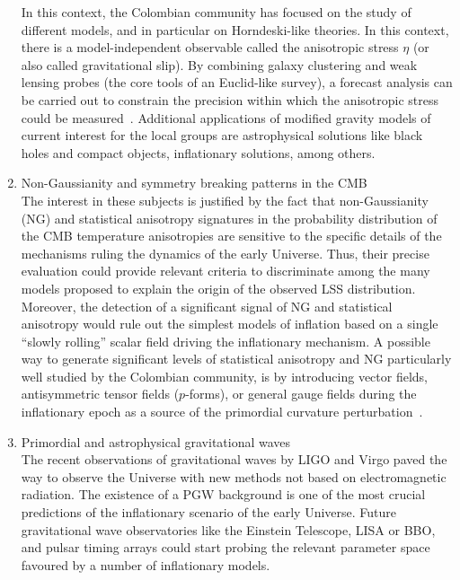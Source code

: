 \documentclass[a4paper,11pt]{article}
\begin{document}
\begin{enumerate}
In this context, the Colombian community has focused on the study of different models, and in particular on Horndeski-like theories. In this context, there is a model-independent observable called the anisotropic stress $\eta$ (or also called gravitational slip). By combining galaxy clustering and weak lensing probes (the core tools of an Euclid-like survey), a forecast analysis can be carried out to constrain the precision within which the anisotropic stress could be measured~\cite{Amendola:2013qna}. Additional applications of modified gravity models of current interest for the local groups are astrophysical solutions like black holes and compact objects, inflationary solutions, among others. 
%
\item
Non-Gaussianity and symmetry breaking patterns in the CMB\\
The interest in these subjects is justified by the fact that non-Gaussianity (NG) and statistical anisotropy signatures in the probability distribution of the CMB temperature anisotropies are sensitive to the specific details of the mechanisms ruling the dynamics of the early Universe. Thus, their precise evaluation could provide relevant criteria to discriminate among the many models proposed to explain the origin of the observed LSS distribution. Moreover, the detection of a significant signal of NG and statistical anisotropy would rule out the simplest models of inflation based on a single ``slowly rolling'' scalar field driving the inflationary mechanism. A possible way to generate significant levels of statistical anisotropy and NG particularly well studied by the Colombian community, is by introducing vector fields, antisymmetric tensor fields ($p$-forms), or general gauge fields during the inflationary epoch as a source of the primordial curvature perturbation~\cite{ValenzuelaToledo:2009af, ValenzuelaToledo:2009nq, ValenzuelaToledo:2011fj, BeltranAlmeida:2011db, Rodriguez:2013cj, Almeida:2014ava, Fleury:2014qfa, Almeida:2017lrq, Almeida:2019xzt, Almeida:2019hhx}.
%
\item
Primordial and astrophysical gravitational waves\\
The recent observations of gravitational waves by LIGO and Virgo paved the way to observe the Universe with new methods not based on electromagnetic radiation. The existence of a PGW background is one of the most crucial predictions of the inflationary scenario of the early Universe. Future gravitational wave observatories like the Einstein Telescope, LISA or BBO, and pulsar timing arrays could start probing the relevant parameter space favoured by a number of inflationary models.

\end{enumerate}
\end{document}

